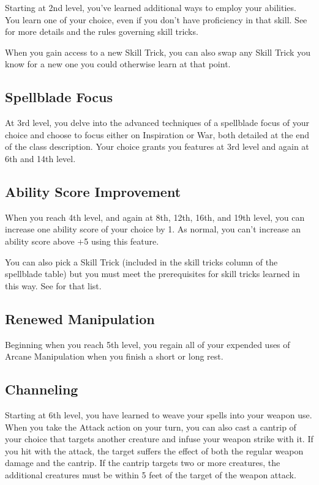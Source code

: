 Starting at 2nd level, you've learned additional ways to employ your abilities. You learn one  of your choice, even if you don't have proficiency in that skill. See  for more details and the rules governing skill tricks.

When you gain access to a new Skill Trick, you can also swap any Skill Trick you know for a new one you could otherwise learn at that point.

\subsection{Spellblade Focus}

At 3rd level, you delve into the advanced techniques of a spellblade focus of your choice and choose to focus either on Inspiration or War, both detailed at the end of the class description. Your choice grants you features at 3rd level and again at 6th and 14th level.

\subsection{Ability Score Improvement}

When you reach 4th level, and again at 8th, 12th, 16th, and 19th level, you can increase one ability score of your choice by 1. As normal, you can't increase an ability score above +5 using this feature.

You can also pick a Skill Trick (included in the skill tricks column of the spellblade table) but you must meet the prerequisites for skill tricks learned in this way. See  for that list.

\subsection{Renewed Manipulation}

Beginning when you reach 5th level, you regain all of your expended uses of Arcane Manipulation when you finish a short or long rest.

\subsection{Channeling}
Starting at 6th level, you have learned to weave your spells into your weapon use. When you take the Attack action on your turn, you can also cast a cantrip of your choice that targets another creature and infuse your weapon strike with it. If you hit with the attack, the target suffers the effect of both the regular weapon damage and the cantrip. If the cantrip targets two or more creatures, the additional creatures must be within 5 feet of the target of the weapon attack.

